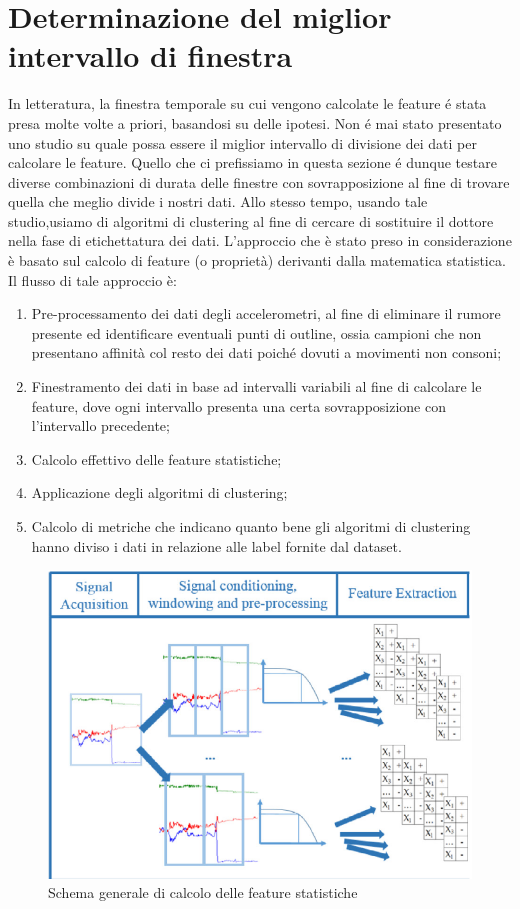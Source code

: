 \section{Determinazione del miglior intervallo di finestra}
In letteratura, la finestra temporale su cui vengono calcolate le feature é stata presa molte volte a priori, basandosi su delle ipotesi. Non é mai stato presentato uno studio su quale possa essere il miglior intervallo di divisione dei dati per calcolare le feature. Quello che ci prefissiamo in questa sezione é dunque testare diverse combinazioni di durata delle finestre con sovrapposizione al fine di trovare quella che meglio divide i nostri dati. Allo stesso tempo, usando tale studio,usiamo di algoritmi di clustering al fine di cercare di sostituire il dottore nella fase di etichettatura dei dati.  L'approccio che è stato preso in considerazione è basato sul calcolo di feature (o proprietà) derivanti dalla matematica statistica. Il flusso di tale approccio è:
\begin{enumerate}
	\item Pre-processamento dei dati degli accelerometri, al fine di eliminare il rumore presente ed identificare eventuali punti di outline, ossia campioni che non presentano affinità col resto dei dati poiché dovuti a movimenti non consoni;
	\item Finestramento dei dati in base ad intervalli variabili al fine di calcolare le feature, dove ogni intervallo presenta una certa sovrapposizione con l'intervallo precedente;
	\item Calcolo effettivo delle feature statistiche;
	\item Applicazione degli algoritmi di clustering;
	\item Calcolo di metriche che indicano quanto bene gli algoritmi di clustering hanno diviso i dati in relazione alle label fornite dal dataset.
\end{enumerate}
\begin{figure}[h!]
	\centering
	\includegraphics[scale=0.6]{images/flusso_feature.png}
	\caption{Schema generale di calcolo delle feature statistiche}
	\label{Flusso Feature}
\end{figure}
